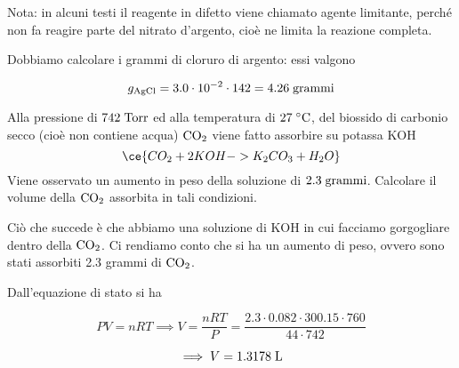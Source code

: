 \begin{soluzione}
Nota: in alcuni testi il reagente in difetto viene chiamato agente limitante, perché non fa reagire parte del nitrato d'argento, cioè ne limita la reazione completa.

Dobbiamo calcolare i grammi di cloruro di argento: essi valgono

$$g_{\text{AgCl}}=3.0 \cdot 10^{-2} \cdot 142=4.26 \; \rm grammi$$

\end{soluzione}

\newpage

\begin{esercizio}[$\bigstar$]
    Alla pressione di $742 \; \rm Torr$ ed alla temperatura di $27 \; ^{\circ} \rm C$, del biossido di carbonio secco (cioè non contiene acqua) $\rm CO_2$ viene fatto assorbire su potassa KOH
    $$\ce{CO_2 + 2KOH -> K_2CO_3 + H_2O}$$
    Viene osservato un aumento in peso della soluzione di $2.3 \; \rm grammi$. Calcolare il volume della $\rm CO_2$ assorbita in tali condizioni.
\end{esercizio}
\begin{soluzione}
    Ciò che succede è che abbiamo una soluzione di KOH in cui facciamo gorgogliare dentro della $\rm CO_2$. Ci rendiamo conto che si ha un aumento di peso, ovvero sono stati assorbiti 2.3 grammi di $\rm CO_2$.

Dall'equazione di stato si ha

$$PV=nRT
\implies
V=\frac{nRT}{P}=\frac{2.3 \cdot 0.082 \cdot 300.15 \cdot 760}{44 \cdot 742}$$

$$\implies V=1.3178 \; \rm L$$

\end{soluzione}

\newpage

